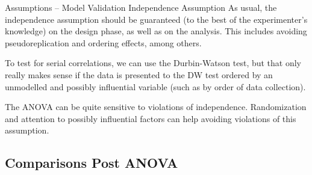 \begin{frame}[fragile]
{Assumptions -- Model Validation}
{Independence Assumption}
As usual, the independence assumption should be guaranteed (to the best of the experimenter's knowledge) on the design phase, as well as on the analysis. This includes avoiding pseudoreplication and ordering effects, among others.
\bigskip

To test for serial correlations, we can use the Durbin-Watson test, but that only really makes sense if the data is presented to the DW test ordered by an unmodelled and possibly influential variable (such as by order of data collection).\bigskip
%

\alert{The ANOVA can be quite sensitive to violations of independence}. Randomization and attention to possibly influential factors can help avoiding violations of this assumption.
\end{frame}
%
%

\subsection{Comparisons Post ANOVA}

